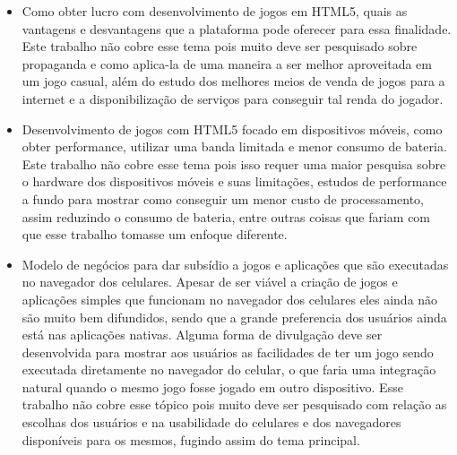 \begin{itemize}
    \item Como obter lucro com desenvolvimento de jogos em HTML5, quais as vantagens
    e desvantagens que a plataforma pode oferecer para essa
    finalidade. Este trabalho não cobre esse tema pois muito deve ser
    pesquisado sobre propaganda e como aplica-la de uma maneira a ser
    melhor aproveitada em um jogo casual, além do estudo dos melhores
    meios de venda de jogos para a internet e a disponibilização de
    serviços para conseguir tal renda do jogador.

    \item Desenvolvimento de jogos com HTML5 focado em dispositivos móveis, como
    obter performance, utilizar uma banda limitada e menor consumo de
    bateria. Este trabalho não cobre esse tema pois isso requer uma maior
    pesquisa sobre o hardware dos dispositivos móveis e suas limitações,
    estudos de performance a fundo para mostrar como conseguir um menor
    custo de processamento, assim reduzindo o consumo de bateria, entre
    outras coisas que fariam com que esse trabalho tomasse um enfoque
    diferente.

    \item Modelo de negócios para dar subsídio a jogos e aplicações
    que são executadas no navegador dos celulares. Apesar de ser viável
    a criação de jogos e aplicações simples que funcionam no navegador
    dos celulares eles ainda não são muito bem difundidos, sendo que a
    grande preferencia dos usuários ainda está nas aplicações nativas.
    Alguma forma de divulgação deve ser desenvolvida para mostrar aos
    usuários as facilidades de ter um jogo sendo executada diretamente
    no navegador do celular, o que faria uma integração natural quando
    o mesmo jogo fosse jogado em outro dispositivo. Esse trabalho não
    cobre esse tópico pois muito deve ser pesquisado com relação as
    escolhas dos usuários e na usabilidade do celulares e dos
    navegadores disponíveis para os mesmos, fugindo assim do tema
    principal.
\end{itemize}
